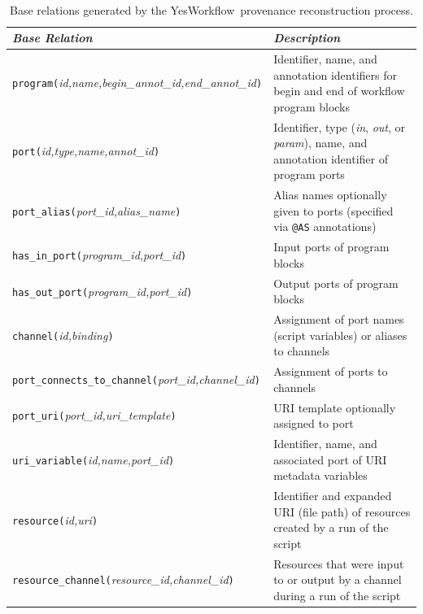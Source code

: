 \documentclass[nocopyrightspace]{sigplanconf}
\newcommand{\YW}{\textsf{YesWorkflow}}
\begin{document}
\begin{table}[thb]
{\small ~\hfill
\begin{tabular}{|l|l|} \hline
\textbf{\em Base Relation} & \textbf{\em Description} \\ \hline\hline

{\tt program(}{\em id,name,begin\_annot\_id,end\_annot\_id}{\tt )} & 
Identifier, name, and annotation identifiers for begin and end of workflow 
program blocks
\\ \hline

{\tt port(}{\em id,type,name,annot\_id}{\tt )} & 
Identifier, type (\emph{in}, \emph{out}, or \emph{param}), name, and annotation identifier
of program ports
\\ \hline

{\tt port\_alias(}{\em port\_id,alias\_name}{\tt )} &
Alias names optionally given to ports (specified via {\tt @AS} annotations) 
\\ \hline

{\tt has\_in\_port(}{\em program\_id,port\_id}{\tt )} &
Input ports of program blocks 
\\ \hline

{\tt has\_out\_port(}{\em program\_id,port\_id}{\tt )} &
Output ports of program blocks 
\\ \hline

{\tt channel(}{\em id,binding}{\tt )} & 
Assignment of port names (script variables) or aliases to channels
\\ \hline

{\tt port\_connects\_to\_channel(}{\em port\_id,channel\_id}{\tt)} & 
Assignment of ports to channels 
\\ \hline

{\tt port\_uri(}{\em port\_id,uri\_template}{\tt)} & 
URI template optionally assigned to port
\\ \hline

{\tt uri\_variable(}{\em id,name,port\_id}{\tt )} & 
Identifier, name, and associated port of URI metadata variables 
\\ \hline

{\tt resource(}{\em id,uri}{\tt )} & 
Identifier and expanded URI (file path) of resources created by a run of the script 
\\ \hline

{\tt resource\_channel(}{\em resource\_id,channel\_id}{\tt )} & 
Resources that were input to or output by a channel
during a run of the script
\\ \hline  
\end{tabular} \hfill ~}
\nocaptionrule
\caption{Base relations generated by the \YW\ provenance 
  reconstruction process.}
\label{tbl:baserels}
\end{table}
\end{document}
